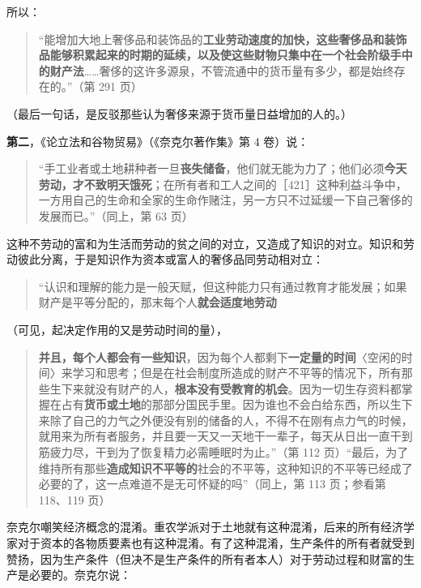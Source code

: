 所以：

\begin{quote}“能增加大地上奢侈品和装饰品的\textbf{工业劳动速度的加快，这些奢侈品和装饰品能够积累起来的时期的延续，以及使这些财物只集中在一个社会阶级手中的财产法}……奢侈的这许多源泉，不管流通中的货币量有多少，都是始终存在的。”（第 291 页）\end{quote}

（最后一句话，是反驳那些认为奢侈来源于货币量日益增加的人的。）

\textbf{第二}，《论立法和谷物贸易》（《奈克尔著作集》第 4 卷）说：

\begin{quote}“手工业者或土地耕种者一旦\textbf{丧失储备}，他们就无能为力了；他们必须\textbf{今天劳动，才不致明天饿死}；在所有者和工人之间的［421］这种利益斗争中，一方用自己的生命和全家的生命作赌注，另一方只不过延缓一下自己奢侈的发展而已。”（同上，第 63 页）\end{quote}

这种不劳动的富和为生活而劳动的贫之间的对立，又造成了知识的对立。知识和劳动彼此分离，于是知识作为资本或富人的奢侈品同劳动相对立：

\begin{quote}“认识和理解的能力是一般天赋，但这种能力只有通过教育才能发展；如果财产是平等分配的，那末每个人\textbf{就会适度地劳动}\end{quote}

（可见，起决定作用的又是劳动时间的量），

\begin{quote}\textbf{并且，每个人都会有一些知识}，因为每个人都剩下\textbf{一定量的时间}〈空闲的时间〉来学习和思考；但是在社会制度所造成的财产不平等的情况下，所有那些生下来就没有财产的人，\textbf{根本没有受教育的机会}。因为一切生存资料都掌握在占有\textbf{货币或土地}的那部分国民手里。因为谁也不会白给东西，所以生下来除了自己的力气之外便没有别的储备的人，不得不在刚有点力气的时候，就用来为所有者服务，并且要一天又一天地干一辈子，每天从日出一直干到筋疲力尽，干到为了恢复精力必需睡眠时为止。”（第 112 页）“最后，为了维持所有那些\textbf{造成知识不平等的}社会的不平等，这种知识的不平等已经成了必要的了，这一点难道不是无可怀疑的吗”（同上，第 113 页；参看第 118、119 页）\end{quote}

奈克尔嘲笑经济概念的混淆。重农学派对于土地就有这种混淆，后来的所有经济学家对于资本的各物质要素也有这种混淆。有了这种混淆，生产条件的所有者就受到赞扬，因为生产条件（但决不是生产条件的所有者本人）对于劳动过程和财富的生产是必要的。奈克尔说：

